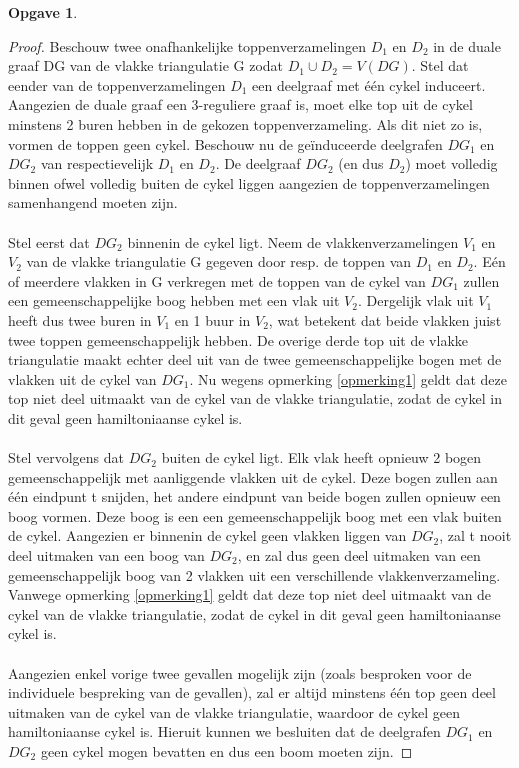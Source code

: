 \documentclass[11pt, a4paper, table]{article}
\theoremstyle{definition}
\newtheorem{opgave}{Opgave}
\theoremstyle{definition}
\theoremstyle{definition}
\begin{document}
\begin{opgave}
	\begin{proof}
		Beschouw twee onafhankelijke toppenverzamelingen $D_1$ en $D_2$ in de duale graaf DG van de vlakke triangulatie G zodat $D_1 \cup D_2 = V(DG)$. Stel dat eender van de toppenverzamelingen $D_1$ een deelgraaf met \'{e}\'{e}n cykel induceert. Aangezien de duale graaf een 3-reguliere graaf is, moet elke top uit de cykel minstens 2 buren hebben in de gekozen toppenverzameling. Als dit niet zo is, vormen de toppen geen cykel. Beschouw nu de ge\"{i}nduceerde deelgrafen $DG_1$ en $DG_2$ van respectievelijk $D_1$ en $D_2$. De deelgraaf $DG_2$ (en dus $D_2$) moet volledig binnen ofwel volledig buiten de cykel liggen aangezien de toppenverzamelingen samenhangend moeten zijn. 
		\\\\Stel eerst dat $DG_2$ binnenin de cykel ligt. Neem de vlakkenverzamelingen $V_1$ en $V_2$ van de vlakke triangulatie G  gegeven door resp. de toppen van $D_1$ en $D_2$. E\'{e}n of meerdere vlakken in G verkregen met de toppen van de cykel van $DG_1$ zullen een gemeenschappelijke boog hebben met een vlak uit $V_2$. Dergelijk vlak uit $V_1$ heeft dus twee buren in $V_1$ en 1 buur in $V_2$, wat betekent dat beide vlakken juist twee toppen gemeenschappelijk hebben. De overige derde top uit de vlakke triangulatie maakt echter deel uit van de twee gemeenschappelijke bogen met de vlakken uit de cykel van $DG_1$.  Nu wegens opmerking \ref{opmerking1} geldt dat deze top niet deel uitmaakt van de cykel van de vlakke triangulatie, zodat de cykel in dit geval geen hamiltoniaanse cykel is.
		\\\\Stel vervolgens dat $DG_2$ buiten de cykel ligt. Elk vlak heeft opnieuw 2 bogen gemeenschappelijk met aanliggende vlakken uit de cykel. Deze bogen zullen aan \'{e}\'{e}n eindpunt t snijden, het andere eindpunt van beide bogen zullen opnieuw een boog vormen. Deze boog is een een gemeenschappelijk boog met een vlak buiten de cykel. Aangezien er binnenin de cykel geen vlakken liggen van $DG_2$, zal t nooit deel uitmaken van een boog van $DG_2$, en zal dus geen deel uitmaken van een gemeenschappelijk boog van 2 vlakken uit een verschillende vlakkenverzameling. Vanwege opmerking \ref{opmerking1} geldt dat deze top niet deel uitmaakt van de cykel van de vlakke triangulatie, zodat de cykel in dit geval geen hamiltoniaanse cykel is. 
		\\\\Aangezien enkel vorige twee gevallen mogelijk zijn (zoals besproken voor de individuele bespreking van de gevallen), zal er altijd minstens \'{e}\'{e}n top geen deel uitmaken van de cykel van de vlakke triangulatie, waardoor de cykel geen hamiltoniaanse cykel is. Hieruit kunnen we besluiten dat de deelgrafen $DG_1$ en $DG_2$ geen cykel mogen bevatten en dus een boom moeten zijn.

\end{proof}
\end{opgave}
\end{document}
